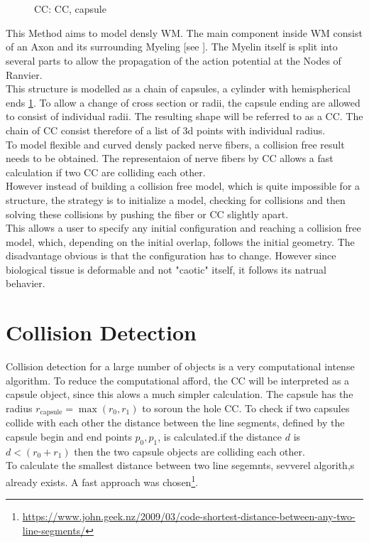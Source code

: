 \section{\VCS}
% 
\begin{figure}[!tbh]
    \centering
	\caption[cc and co]{\Acf{CC}:  \ac{CC},  capsule}
	\label{fig:conical_capsule}
\end{figure}
% 
This Method aims to model densly \ac{WM}. The main component inside \ac{WM} consist of an Axon and its surrounding Myeling [see \dummy]. The Myelin itself is split into several parts to allow the propagation of the action potential at the Nodes of Ranvier. \\
% 
This structure is modelled as a chain of capsules, a cylinder with hemispherical ends \cref{fig:conical_capsule}. To allow a change of cross section or radii, the capsule ending are allowed to consist of individual radii. The resulting shape will be referred to as a \ac{CC}. The chain of \ac{CC} consist therefore of a list of 3d points with individual radius. \\
% 
To model flexible and curved densly packed nerve fibers, a collision free result needs to be obtained. The representaion of nerve fibers by \ac{CC} allows a fast calculation if two \ac{CC} are colliding each other. \\
% 
However instead of building a collision free model, which is quite impossible for a \dummy structure, the strategy is to initialize a model, checking for collisions and then solving these collisions by pushing the fiber or \ac{CC} slightly apart. \\
% 
This allows a user to specify any initial configuration and reaching a collision free model, which, depending on the initial overlap, follows the initial geometry. The disadvantage obvious is that the configuration has to change. However since biological tissue is deformable and not "caotic" itself, it follows its natrual behavier.
%
% 
% 
\section{Collision Detection}
% 
Collision detection for a large number of objects is a very computational intense algorithm.
To reduce the computational afford, the \ac{CC} will be interpreted as a capsule object, since this alows a much simpler calculation. The capsule has the radius $r_{\text{capsule}} = \max(r_0, r_1)$ to soroun the hole \ac{CC}. To check if two capsules collide with each other the distance between the line segments, defined by the capsule begin and end points $p_0, p_1$, is calculated.if the distance $d$ is $d < (r_0 + r_1)$ then the two capsule objects are colliding each other. \\
% 
To calculate the smallest distance between two line segemnts, sevverel algorith,s already exists. A fast approach was chosen\footnote{\href{https://www.john.geek.nz/2009/03/code-shortest-distance-between-any-two-line-segments/}{https://www.john.geek.nz/2009/03/code-shortest-distance-between-any-two-line-segments/}}.
%
